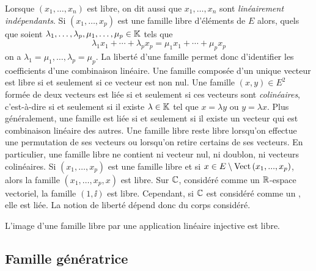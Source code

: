 \documentclass{magnolia}
\begin{document}
\begin{remarques}
\remarque Lorsque $(x_1,\ldots,x_n)$ est libre, on dit aussi que $x_1,\ldots,x_n$ sont
  \emph{linéairement indépendants}.
\remarque Si $(x_1,\ldots,x_p)$ est une famille libre d'éléments de $E$ alors,
  quels que soient $\lambda_1,\ldots,\lambda_p,\mu_1,\ldots,\mu_p\in\mathbb{K}$ tels que
  \[\lambda_1 x_1+\cdots+\lambda_p x_p=\mu_1 x_1+\cdots+\mu_p x_p\]
  on a $\lambda_1=\mu_1,\ldots,\lambda_p=\mu_p$. La liberté d'une famille permet
  donc \og d'identifier \fg les coefficients d'une combinaison linéaire.
\remarque[utile=-3] Une famille composée d'un unique vecteur est libre si et seulement si
  ce vecteur est non nul.
\remarque Une famille $(x,y)\in E^2$ formée de deux vecteurs est liée si et
  seulement si ces vecteurs sont \emph{colinéaires}, c'est-à-dire si et seulement si il existe
  $\lambda\in\mathbb{K}$ tel que $x=\lambda y$ ou $y=\lambda x$. Plus généralement, une famille est
  liée si et seulement si il existe un vecteur qui est combinaison linéaire des
  autres.  
\remarque[utile=-3] Une famille libre reste libre lorsqu'on effectue une permutation
  de ses vecteurs ou lorsqu'on retire certains de ses vecteurs. En particulier, une famille
  libre ne contient ni vecteur nul, ni doublon, ni vecteurs colinéaires.
\remarque Si $(x_1,\ldots,x_p)$ est
une famille libre et si $x\in E\setminus\operatorname{Vect}\left(x_1,...,x_p\right)$, alors la famille
$(x_1,\ldots,x_p,x)$ est libre.
\remarque[utile=-1] Sur $\mathbb{C}$, considéré comme un $\mathbb{R}$-espace vectoriel, la famille
  $(1,\ii)$ est libre. Cependant, si $\mathbb{C}$ est considéré comme un \Cev, elle est liée. La notion
  de liberté dépend donc du corps considéré.
\end{remarques}

\begin{proposition}
L'image d'une famille libre par une application linéaire injective est libre.
\end{proposition}

\subsection{Famille génératrice}
\end{document}
